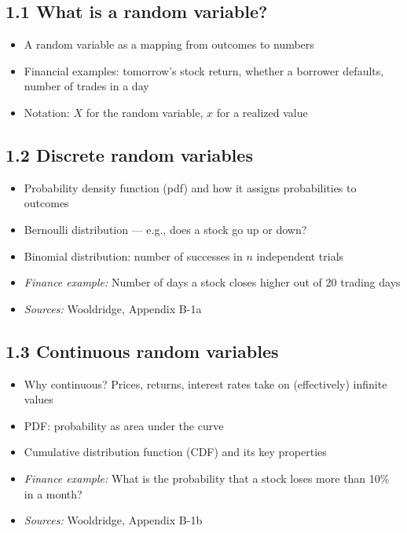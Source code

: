\documentclass[letterpaper,10pt]{article}
\begin{document}
\subsection*{1.1 What is a random variable?}
\begin{itemize}
    \item A random variable as a mapping from outcomes to numbers
    \item Financial examples: tomorrow's stock return, whether a borrower defaults, number of trades in a day
    \item Notation: $X$ for the random variable, $x$ for a realized value
\end{itemize}

\subsection*{1.2 Discrete random variables}
\begin{itemize}
    \item Probability density function (pdf) and how it assigns probabilities to outcomes
    \item Bernoulli distribution --- e.g., does a stock go up or down?
    \item Binomial distribution: number of successes in $n$ independent trials
    \item \textit{Finance example:} Number of days a stock closes higher out of 20 trading days
    \item \textit{Sources:} Wooldridge, Appendix B-1a
\end{itemize}

\subsection*{1.3 Continuous random variables}
\begin{itemize}
    \item Why continuous? Prices, returns, interest rates take on (effectively) infinite values
    \item PDF: probability as area under the curve
    \item Cumulative distribution function (CDF) and its key properties
    \item \textit{Finance example:} What is the probability that a stock loses more than 10\% in a month?
    \item \textit{Sources:} Wooldridge, Appendix B-1b
\end{itemize}
\end{document}
